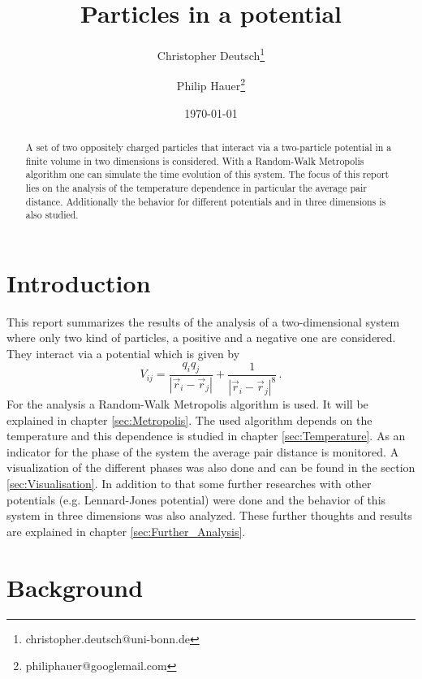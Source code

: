 \documentclass[11pt, a4paper]{article}
\title{Particles in a potential}
\author{Christopher Deutsch\footnote{christopher.deutsch@uni-bonn.de} \and Philip Hauer\footnote{philiphauer@googlemail.com}}
\date{\today}
\numberwithin{equation}{section}
\begin{document}
\begin{titlepage}

\maketitle

\begin{abstract}
\noindent 
A set of two oppositely charged particles that interact via a two-particle potential in a finite volume in two dimensions is considered.
With a Random-Walk Metropolis algorithm one can simulate the time evolution of this system.
The focus of this report lies on the analysis of the temperature dependence in particular the average pair distance.
Additionally the behavior for different potentials and in three dimensions is also studied.
\end{abstract}

\end{titlepage}

\tableofcontents
\newpage


\section{Introduction}
This report summarizes the results of the analysis of a two-dimensional system where only two kind of particles, a positive and a negative one are considered.
They interact via a potential which is given by
\begin{equation}
V_{ij} = \frac{q_i q_j}{\left| \vec{r}_i - \vec{r}_j \right|} + \frac{1}{\left| \vec{r}_i - \vec{r}_j \right|^8} \, \text{.} \label{Eq:Potential}
\end{equation}
For the analysis a Random-Walk Metropolis algorithm is used. It will be explained in chapter \ref{sec:Metropolis}.
The used algorithm depends on the temperature and this dependence is studied in chapter \ref{sec:Temperature}.
As an indicator for the phase of the system the average pair distance is monitored.
A visualization of the different phases was also done and can be found in the section \ref{sec:Visualisation}.
In addition to that some further researches with other potentials (e.g. Lennard-Jones potential) were done and the behavior of this system in three dimensions was also analyzed.
These further thoughts and results are explained in chapter \ref{sec:Further_Analysis}.


\section{Background}
\end{document}
